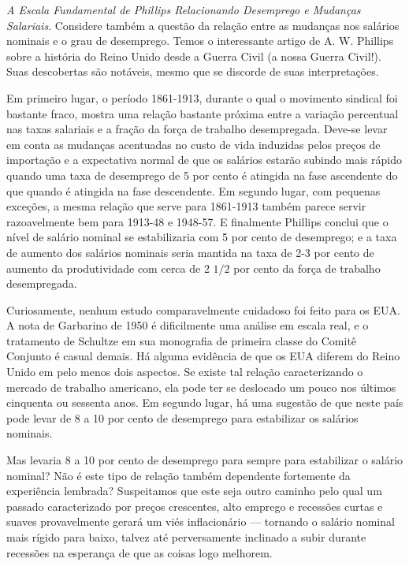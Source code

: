 \documentclass[12pt]{article}
\begin{document}
\textit{A Escala Fundamental de Phillips Relacionando Desemprego e Mudanças Salariais}. Considere também a questão da relação entre as mudanças nos salários nominais e o grau de desemprego. Temos o interessante artigo de A. W. Phillips sobre a história do Reino Unido desde a Guerra Civil (a nossa Guerra Civil!). Suas descobertas são notáveis, mesmo que se discorde de suas interpretações.

Em primeiro lugar, o período 1861-1913, durante o qual o movimento sindical foi bastante fraco, mostra uma relação bastante próxima entre a variação percentual nas taxas salariais e a fração da força de trabalho desempregada. Deve-se levar em conta as mudanças acentuadas no custo de vida induzidas pelos preços de importação e a expectativa normal de que os salários estarão subindo mais rápido quando uma taxa de desemprego de 5 por cento é atingida na fase ascendente do que quando é atingida na fase descendente. Em segundo lugar, com pequenas exceções, a mesma relação que serve para 1861-1913 também parece servir razoavelmente bem para 1913-48 e 1948-57. E finalmente Phillips conclui que o nível de salário nominal se estabilizaria com 5 por cento de desemprego; e a taxa de aumento dos salários nominais seria mantida na taxa de 2-3 por cento de aumento da produtividade com cerca de 2 $1/2$ por cento da força de trabalho desempregada.

Curiosamente, nenhum estudo comparavelmente cuidadoso foi feito para os EUA. A nota de Garbarino de 1950 é dificilmente uma análise em escala real, e o tratamento de Schultze em sua monografia de primeira classe do Comitê Conjunto é casual demais. Há alguma evidência de que os EUA diferem do Reino Unido em pelo menos dois aspectos. Se existe tal relação caracterizando o mercado de trabalho americano, ela pode ter se deslocado um pouco nos últimos cinquenta ou sessenta anos. Em segundo lugar, há uma sugestão de que neste país pode levar de 8 a 10 por cento de desemprego para estabilizar os salários nominais.

Mas levaria 8 a 10 por cento de desemprego para sempre para estabilizar o salário nominal? Não é este tipo de relação também dependente fortemente da experiência lembrada? Suspeitamos que este seja outro caminho pelo qual um passado caracterizado por preços crescentes, alto emprego e recessões curtas e suaves provavelmente gerará um viés inflacionário — tornando o salário nominal mais rígido para baixo, talvez até perversamente inclinado a subir durante recessões na esperança de que as coisas logo melhorem.
\end{document}
